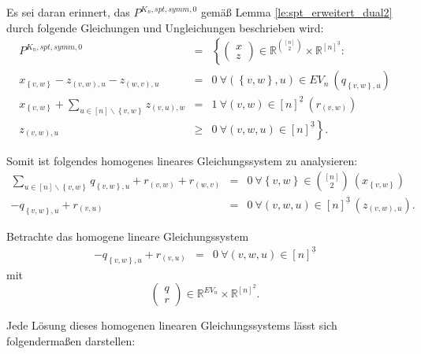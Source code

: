 \documentclass[10p,a4paper,BCOR = 12mm, DIV=15]{scrbook}
\begin{document}
{Es sei daran erinnert, das $P^{K_n, spt, symm, 0}$ gemäß Lemma \ref{le:spt_erweitert_dual2} durch folgende Gleichungen und Ungleichungen beschrieben wird:
\begin{eqnarray*}
P^{K_n, spt, symm, 0} & = & \left\{
\left(\begin{array}{c}
x \\
z
\end{array}\right)\in\mathbb{R}^{[n]\choose 2}\times \mathbb{R}^{[n]^{\underline{3}}}: \right. \\
x_{\left\{v, w\right\}} - z_{\left(v, w\right), u} - z_{\left(w, v\right), u} & = & 0\ \forall \left(\left\{v, w\right\}, u\right)\in EV_n\ \left(q_{\left\{v, w\right\}, u}\right)\\
x_{\left\{v, w\right\}} + \sum_{u\in[n]\backslash\left\{v, w\right\}} z_{\left(v, u\right), w} & = & 1\ \forall \left(v, w\right)\in [n]^{\underline{2}} \ \left(r_{\left(v, w\right)}\right) \\
z_{\left(v, w\right), u} & \geq & \left.0\ \forall \left(v, w, u\right)\in [n]^{\underline{3}} \right\}.
\end{eqnarray*}

Somit ist folgendes homogenes lineares Gleichungssystem zu analysieren:
\begin{eqnarray*}
\sum_{u\in[n]\backslash\left\{v, w\right\}} q_{\left\{v, w\right\}, u} + r_{\left(v, w\right)} + r_{\left(w, v\right)} & = & 0\ \forall \left\{v, w\right\}\in {[n] \choose 2} \ \left(x_{\left\{v, w\right\}}\right) \\
-q_{\left\{v, w\right\}, u} + r_{\left(v, u\right)} & = & 0\ \forall \left(v, w, u\right)\in [n]^{\underline{3}} \ \left(z_{\left(v, w\right), u}\right).
\end{eqnarray*}

\begin{Le}
\label{le:kern}
Betrachte das homogene lineare Gleichungssystem
\begin{eqnarray}
-q_{\left\{v, w\right\}, u} + r_{\left(v, u\right)} & = & 0\ \forall \left(v, w, u\right)\in [n]^{\underline{3}}  \label{eq:le_kern}
\end{eqnarray}
mit
\begin{displaymath}
\left(\begin{array}{c}
q \\
r
\end{array}\right) \in \mathbb{R}^{EV_n}\times \mathbb{R}^{[n]^{\underline{2}}}.
\end{displaymath}

Jede Lösung dieses homogenen linearen Gleichungssystems lässt sich folgendermaßen darstellen:


\end{Le}}
\end{document}
